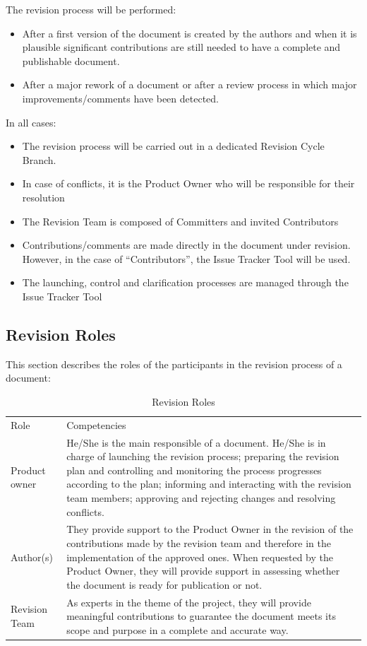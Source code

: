 \documentclass{template/openetcs_article}
\begin{document}
The revision process will be performed:
\begin{itemize}
\item After a first version of the document is created by the authors and when it is plausible significant contributions are still needed to have a complete and publishable document.
\item After a major rework of a document or after a review process in which major improvements/comments have been detected.
\end{itemize}
In all cases:
\begin{itemize}
\item The revision process will be carried out in a dedicated Revision Cycle Branch.
\item In case of conflicts, it is the Product Owner who will be responsible for their resolution
\item The Revision Team is composed of Committers and invited Contributors
\item Contributions/comments are made directly in the document under revision. However, in the case of “Contributors”, the Issue Tracker Tool will be used.
\item The launching, control and clarification processes are managed through the Issue Tracker Tool
\end{itemize}

\subsection{Revision Roles}

This section describes the roles of the participants in the revision process of a document:
\begin{table}[H]
\begin{tabular}{|m{3cm}|m{11cm}|}
\hline
\rowcolor{myblue}
\multicolumn{2}{|c|}{Roles} \\\hline
\rowcolor{lightgray}
Role &
Competencies \\\hline
Product owner &
He/She is the main responsible of a document. 
He/She is in charge of launching the revision process; preparing the revision plan and controlling and monitoring the process progresses according to the plan; informing and interacting with the revision team members; approving and rejecting changes and resolving conflicts.
\\\hline
Author(s) & 
They provide support to the Product Owner in the revision of the contributions made by the revision team and therefore in the implementation of the approved ones. When requested by the Product Owner, they will provide support in assessing whether the document is ready for publication or not.
\\\hline
Revision Team &
As experts in the theme of the project, they will provide meaningful contributions to guarantee the document meets its scope and purpose  in a complete and accurate way. \\\hline
\end{tabular}
\caption{Revision Roles}
\end{table}
\end{document}

